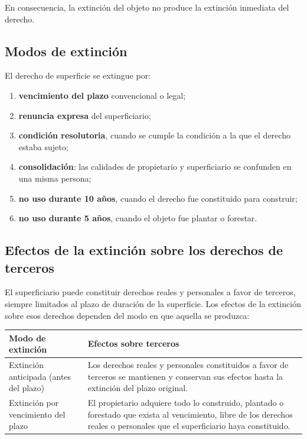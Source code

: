 \documentclass[12pt,oneside]{book}
\begin{document}
En consecuencia, la extinción del objeto no produce la extinción inmediata del derecho.

\subsection{Modos de extinción}

El derecho de superficie se extingue por:

\begin{enumerate}
    \item \textbf{vencimiento del plazo} convencional o legal;
    \item \textbf{renuncia expresa} del superficiario;
    \item \textbf{condición resolutoria}, cuando se cumple la condición a la que el derecho estaba sujeto;
    \item \textbf{consolidación}: las calidades de propietario y superficiario se confunden en una misma persona;
    \item \textbf{no uso durante 10 años}, cuando el derecho fue constituido para construir;
    \item \textbf{no uso durante 5 años}, cuando el objeto fue plantar o forestar.
\end{enumerate}

\subsection{Efectos de la extinción sobre los derechos de terceros}

El superficiario puede constituir derechos reales y personales a favor de terceros, siempre limitados al plazo de duración de la superficie. Los efectos de la extinción sobre esos derechos dependen del modo en que aquella se produzca:

\begin{table}[H]
\centering
\begin{tabularx}{\textwidth}{@{}>{\raggedright\arraybackslash}p{}>{\raggedright\arraybackslash}X@{}}
\toprule
\textbf{Modo de extinción} & \textbf{Efectos sobre terceros} \\
\midrule
Extinción anticipada (antes del plazo) & Los derechos reales y personales constituidos a favor de terceros se mantienen y conservan sus efectos hasta la extinción del plazo original. \\
Extinción por vencimiento del plazo & El propietario adquiere todo lo construido, plantado o forestado que exista al vencimiento, libre de los derechos reales o personales que el superficiario haya constituido. \\
\bottomrule
\end{tabularx}
\end{table}
\end{document}
